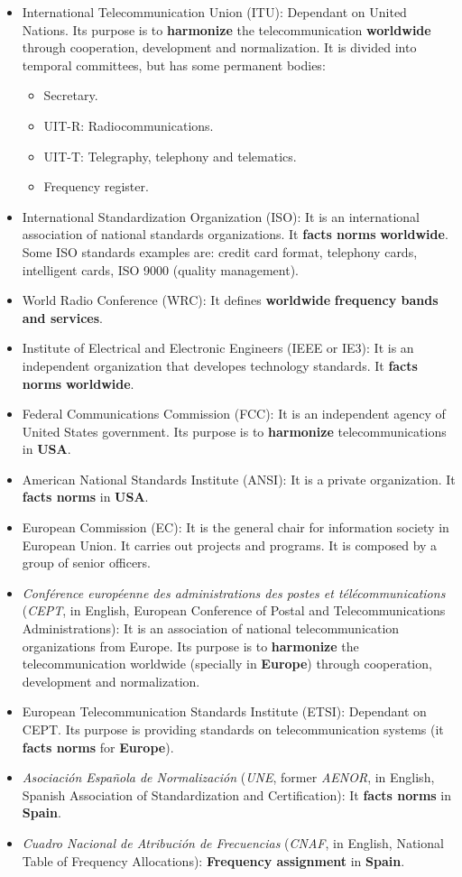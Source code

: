 \documentclass[
	12pt,
	twoside
]{book}
\begin{document}
\begin{itemize}
	\item {
		International Telecommunication Union (ITU): Dependant on United Nations. Its purpose is to \textbf{harmonize} the telecommunication \textbf{worldwide} through cooperation, development and normalization. It is divided into temporal committees, but has some permanent bodies:
		\begin{itemize}
			\item Secretary.
			\item UIT-R: Radiocommunications.
			\item UIT-T: Telegraphy, telephony and telematics.
			\item Frequency register.
		\end{itemize}
	}
	\item International Standardization Organization (ISO): It is an international association of national standards organizations. It \textbf{facts norms} \textbf{worldwide}. Some ISO standards examples are: credit card format, telephony cards, intelligent cards, ISO 9000 (quality management).
	\item World Radio Conference (WRC): It defines \textbf{worldwide} \textbf{frequency bands and services}.
	\item Institute of Electrical and Electronic Engineers (IEEE or IE3): It is an independent organization that developes technology standards. It \textbf{facts norms} \textbf{worldwide}.
	\item Federal Communications Commission (FCC): It is an independent agency of United States government. Its purpose is to \textbf{harmonize} telecommunications in \textbf{USA}.
	\item American National Standards Institute (ANSI): It is a private organization. It \textbf{facts norms} in \textbf{USA}.
	\item European Commission (EC): It is the general chair for information society in European Union. It carries out projects and programs. It is composed by a group of senior officers.
	\item \textit{Conférence européenne des administrations des postes et télécommunications} (\textit{CEPT}, in English, European Conference of Postal and Telecommunications Administrations): It is an association of national telecommunication organizations from Europe. Its purpose is to \textbf{harmonize} the telecommunication worldwide (specially in \textbf{Europe}) through cooperation, development and normalization.
	\item European Telecommunication Standards Institute (ETSI): Dependant on CEPT. Its purpose is providing standards on telecommunication systems (it \textbf{facts norms} for \textbf{Europe}).
	\item \textit{Asociación Española de Normalización} (\textit{UNE}, former \textit{AENOR}, in English, Spanish Association of Standardization and Certification): It \textbf{facts norms} in \textbf{Spain}.
	\item \textit{Cuadro Nacional de Atribución de Frecuencias} (\textit{CNAF}, in English, National Table of Frequency Allocations): \textbf{Frequency assignment} in \textbf{Spain}.
\end{itemize}
\end{document}
